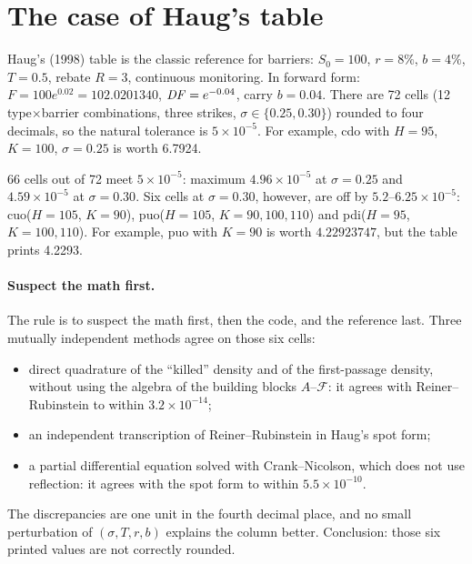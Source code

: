 \section{The case of Haug's table}
Haug's (1998) table is the classic reference for barriers: $S_0=100$, $r=8\%$, $b=4\%$, $T=0.5$, rebate $R=3$,
continuous monitoring. In forward form: $F=100e^{0.02}=102.0201340$, $\mathit{DF}=e^{-0.04}$, carry $b=0.04$. There are 72
cells (12 type$\times$barrier combinations, three strikes, $\sigma\in\{0.25,0.30\}$) rounded to four decimals, so the
natural tolerance is $5\times10^{-5}$. For example, cdo with $H=95$, $K=100$, $\sigma=0.25$ is worth 6.7924.

\begin{esempio}[title={Example: six published values that do not add up}]
66 cells out of 72 meet $5\times10^{-5}$: maximum $4.96\times10^{-5}$ at $\sigma=0.25$ and $4.59\times10^{-5}$ at
$\sigma=0.30$. Six cells at $\sigma=0.30$, however, are off by $5.2$--$6.25\times10^{-5}$: cuo($H=105$, $K=90$),
puo($H=105$, $K=90,100,110$) and pdi($H=95$, $K=100,110$). For example, puo with $K=90$ is worth $4.22923747$, but the
table prints 4.2293.
\end{esempio}

\paragraph{Suspect the math first.} The rule is to suspect the math first, then the code, and the reference last.
Three mutually independent methods agree on those six cells:
\begin{itemize}
\item direct quadrature of the ``killed'' density and of the first-passage density, without using the algebra of the
building blocks $A$--$\mathcal F$: it agrees with Reiner--Rubinstein to within $3.2\times10^{-14}$;
\item an independent transcription of Reiner--Rubinstein in Haug's spot form;
\item a partial differential equation solved with Crank--Nicolson, which does not use reflection: it agrees with the
spot form to within $5.5\times10^{-10}$.
\end{itemize}
The discrepancies are one unit in the fourth decimal place, and no small perturbation of $(\sigma,T,r,b)$ explains the
column better. Conclusion: those six printed values are not correctly rounded.

